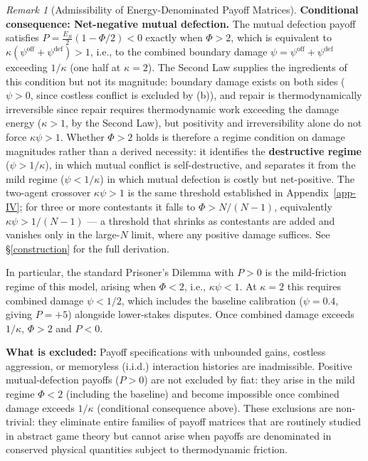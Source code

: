 \documentclass[11pt]{article}
\theoremstyle{plain}
\theoremstyle{definition}
\theoremstyle{remark}
\newtheorem{remark}{Remark}
\begin{document}
\begin{remark}[Admissibility of Energy-Denominated Payoff Matrices]
\textbf{Conditional consequence: Net-negative mutual defection.} The mutual defection payoff satisfies $P = \frac{E_R}{2}(1 - \Phi/2) < 0$ exactly when $\Phi > 2$, which is equivalent to $\kappa(\psi^{\text{off}} + \psi^{\text{def}}) > 1$, i.e., to the combined boundary damage $\psi = \psi^{\text{off}} + \psi^{\text{def}}$ exceeding $1/\kappa$ (one half at $\kappa = 2$). The Second Law supplies the ingredients of this condition but not its magnitude: boundary damage exists on both sides ($\psi > 0$, since costless conflict is excluded by (b)), and repair is thermodynamically irreversible since repair requires thermodynamic work exceeding the damage energy ($\kappa > 1$, by the Second Law), but positivity and irreversibility alone do not force $\kappa\psi > 1$. Whether $\Phi > 2$ holds is therefore a regime condition on damage magnitudes rather than a derived necessity: it identifies the \textbf{destructive regime} ($\psi > 1/\kappa$), in which mutual conflict is self-destructive, and separates it from the mild regime ($\psi < 1/\kappa$) in which mutual defection is costly but net-positive. The two-agent crossover $\kappa\psi > 1$ is the same threshold established in Appendix~\ref{app-IV}; for three or more contestants it falls to $\Phi > N/(N-1)$, equivalently $\kappa\psi > 1/(N-1)$ — a threshold that shrinks as contestants are added and vanishes only in the large-$N$ limit, where any positive damage suffices. See §\ref{construction} for the full derivation.

In particular, the standard Prisoner's Dilemma with $P > 0$ is the mild-friction regime of this model, arising when $\Phi < 2$, i.e., $\kappa\psi < 1$. At $\kappa = 2$ this requires combined damage $\psi < 1/2$, which includes the baseline calibration ($\psi = 0.4$, giving $P = +5$) alongside lower-stakes disputes. Once combined damage exceeds $1/\kappa$, $\Phi > 2$ and $P < 0$.

\textbf{What is excluded:} Payoff specifications with unbounded gains, costless aggression, or memoryless (i.i.d.) interaction histories are inadmissible. Positive mutual-defection payoffs ($P > 0$) are not excluded by fiat: they arise in the mild regime $\Phi < 2$ (including the baseline) and become impossible once combined damage exceeds $1/\kappa$ (conditional consequence above). These exclusions are non-trivial: they eliminate entire families of payoff matrices that are routinely studied in abstract game theory but cannot arise when payoffs are denominated in conserved physical quantities subject to thermodynamic friction.
\end{remark}
\end{document}
